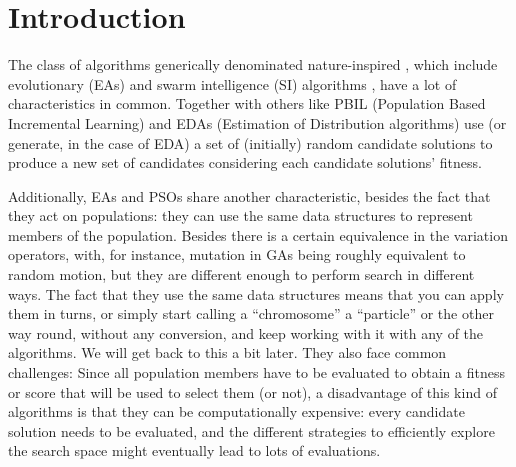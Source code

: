 \documentclass[runningheads]{llncs}
\begin{document}
\section{Introduction}

The class of algorithms generically denominated nature-inspired
\cite{yang2014nature}, which  include evolutionary (EAs) and swarm
intelligence (SI) algorithms
\cite{back1996evolutionary,kennedy2006swarm}, have a lot of
characteristics in common.
Together with others like PBIL (Population Based Incremental Learning)
\cite{baluja1994population} and EDAs (Estimation of Distribution
algorithms) \cite{larranaga2001estimation} use (or generate, in the
case of EDA) a set of (initially) random candidate solutions to
produce a new set of candidates considering each candidate solutions'
fitness.

%
Additionally, EAs and PSOs share another characteristic, besides the fact that they
act on populations: they can use the same data structures to
represent  members of the population.
Besides there is a certain
equivalence in the variation operators, with, for instance, mutation
in GAs being roughly equivalent to random motion, but they are different enough to perform
search in different ways. The fact that they use the same data
structures means that you can apply them in turns, or simply start
calling a ``chromosome'' a ``particle'' or the other way round,
without any conversion, and keep working with it with any of the
algorithms. We will get back to this a bit later.
They also face common challenges: Since all population members have to
be evaluated to obtain a fitness or score that will be used to select
them (or not), a disadvantage of this kind of algorithms is that they
can be computationally expensive: every candidate solution needs to be
evaluated, and the different strategies to efficiently explore the
search space might eventually lead to lots of evaluations.
\end{document}
